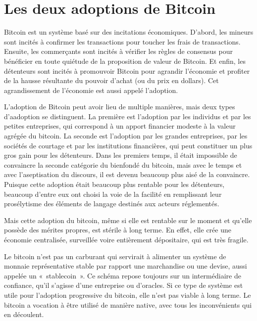 \section*{Les deux adoptions de Bitcoin}

Bitcoin est un système basé sur des incitations économiques. D'abord, les mineurs sont incités à confirmer les transactions pour toucher les frais de transactions. Ensuite, les commerçants sont incités à vérifier les règles de consensus pour bénéficier en toute quiétude de la proposition de valeur de Bitcoin. Et enfin, les détenteurs sont incités à promouvoir Bitcoin pour agrandir l'économie et profiter de la hausse résultante du pouvoir d'achat (ou du prix en dollars). Cet agrandissement de l'économie est aussi appelé l'adoption.

L'adoption de Bitcoin peut avoir lieu de multiple manières, mais deux types d'aadoption se distinguent. La première est l'adoption par les individus et par les petites entreprises, qui correspond à un apport financier modeste à la valeur agrégée du bitcoin. La seconde est l'adoption par les grandes entreprises, par les sociétés de courtage et par les institutions financières, qui peut constituer un plus gros gain pour les détenteurs. Dans les premiers temps, il était impossible de convaincre la seconde catégorie du bienfondé du bitcoin, mais avec le temps et avec l'aseptisation du discours, il est devenu beaucoup plus aisé de la convaincre. Puisque cette adoption était beaucoup plus rentable pour les détenteurs, beaucoup d'entre eux ont choisi la voie de la facilité en remplissant leur prosélytisme des éléments de langage destinés aux acteurs réglementés.

Mais cette adoption du bitcoin, même si elle est rentable sur le moment et qu'elle possède des mérites propres, est stérile à long terme. En effet, elle crée une économie centralisée, surveillée voire entièrement dépositaire, qui est très fragile.

Le bitcoin n'est pas un carburant qui servirait à alimenter un système de monnaie représentative stable par rapport une marchandise ou une devise, aussi appelée un «~stablecoin~». Ce schéma repose toujours sur un intermédiaire de confiance, qu'il s'agisse d'une entreprise ou d'oracles. Si ce type de système est utile pour l'adoption progressive du bitcoin, elle n'est pas viable à long terme. Le bitcoin a vocation à être utilisé de manière native, avec tous les inconvénients qui en découlent.

